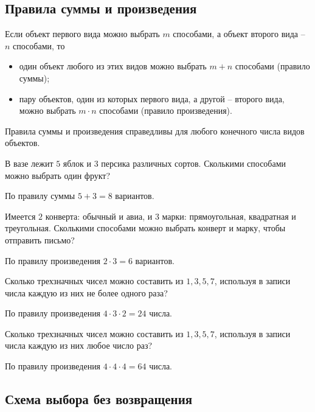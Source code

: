 \subsection{Правила суммы и произведения}

Если объект первого вида можно выбрать \(m\) способами, а объект второго вида -- \(n\) способами, то
\begin{itemize}
    \item один объект любого из этих видов можно выбрать \(m + n\) способами (правило суммы);
    \item пару объектов, один из которых первого вида, а другой -- второго вида, можно выбрать \(m \cdot n\) способами (правило произведения).
\end{itemize}

\begin{note*}
    Правила суммы и произведения справедливы для любого конечного числа видов объектов.
\end{note*}

\begin{example}
    В вазе лежит \(5\) яблок и \(3\) персика различных сортов. Сколькими способами можно выбрать один фрукт?

    По правилу суммы \(5 + 3 = 8\) вариантов.
\end{example}

\begin{example}
    Имеется \(2\) конверта: обычный и авиа, и \(3\) марки: прямоугольная, квадратная и треугольная. Сколькими способами можно выбрать конверт и марку, чтобы отправить письмо?

    По правилу произведения \(2 \cdot 3 = 6\) вариантов.
\end{example}

\begin{example}
    Сколько трехзначных чисел можно составить из \(1, 3, 5, 7\), используя в записи числа каждую из них не более одного раза?

    По правилу произведения \(4 \cdot 3 \cdot 2 = 24\) числа.
\end{example}

\begin{example}
    Сколько трехзначных чисел можно составить из \(1, 3, 5, 7\), используя в записи числа каждую из них любое число раз?

    По правилу произведения \(4 \cdot 4 \cdot 4 = 64\) числа.
\end{example}

\subsection{Схема выбора без возвращения}

